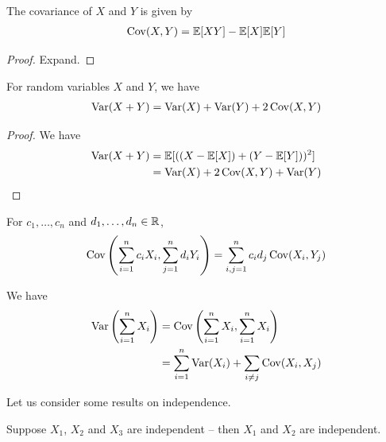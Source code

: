 \documentclass{../template/note}
\begin{document}
    \begin{lemma}
        The covariance of \(X\) and \(Y\) is given by
        \begin{align*}
            \operatorname{Cov}(X, Y) = \mathbb E[XY] - \mathbb E[X]\mathbb E[Y]
        \end{align*}
    \end{lemma}
    
    \begin{proof}
        Expand.
    \end{proof}

    \begin{lemma}
        For random variables \(X\) and \(Y\), we have
        \begin{align*}
            \operatorname{Var}(X+Y) = \operatorname{Var}(X) + \operatorname{Var}(Y) + 2\operatorname{Cov}(X, Y)
        \end{align*}
    \end{lemma}
    
    \begin{proof}
        We have
        \begin{align*}
            \operatorname{Var}(X + Y) &= \mathbb E[((X-\mathbb E[X])+(Y-\mathbb E[Y]))^2] \\
            &= \operatorname{Var}(X) + 2\operatorname{Cov}(X, Y) + \operatorname{Var}(Y)
        \end{align*}
    \end{proof}
    
    \begin{lemma}
        For \(c_1, \dots, c_n\) and \(d_1, \dots, d_n \in \mathbb R\),
        \begin{align*}
            \operatorname{Cov}\left(\sum_{i=1}^n c_iX_i, \sum_{j=1}^n d_iY_i\right) = \sum_{i,j=1}^n c_id_j \operatorname{Cov}(X_i, Y_j)
        \end{align*}
    \end{lemma}
    
    \begin{corollary}
        We have
        \begin{align*}
            \operatorname{Var}\left(\sum_{i=1}^n X_i\right) &= \operatorname{Cov}\left(\sum_{i=1}^n X_i, \sum_{i=1}^n X_i\right) \\
            &= \sum_{i=1}^n \operatorname{Var}(X_i) + \sum_{i \neq j}\operatorname{Cov}(X_i, X_j)
        \end{align*}
    \end{corollary}
    
    Let us consider some results on independence.

    \begin{lemma}
        Suppose \(X_1\), \(X_2\) and \(X_3\) are independent -- then \(X_1\) and \(X_2\) are independent.
    \end{lemma}
\end{document}
